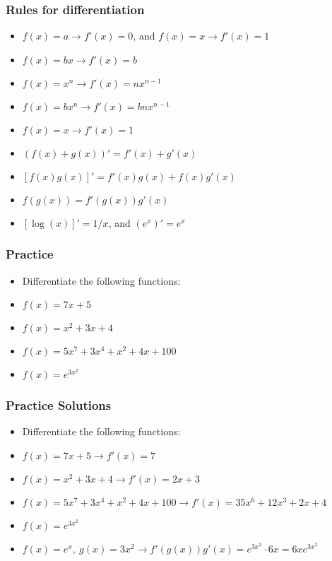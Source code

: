 \documentclass[xcolor=dvipsnames]{beamer} %
\begin{document}
\begin{frame}
\frametitle{Rules for differentiation}
\begin{itemize}
    \setlength\itemsep{1em}
\item $f(x) = a \rightarrow f'(x) = 0$, and $f(x) = x \rightarrow f'(x) = 1$
\item $f(x) = bx \rightarrow f'(x) = b$
\item $f(x) = x^n \rightarrow f'(x) = nx^{n-1}$ %
\item $f(x) = bx^n \rightarrow f'(x) = b n x^{n-1}$
\item $f(x) = x \rightarrow f'(x) = 1$
\item $(f(x) +g(x))' = f'(x) + g'(x)$ 
\item $[f(x)g(x)]' = f'(x)g(x) +f(x)g'(x)$
\item $f(g(x)) =f'(g(x))g'(x)$
\item $[\log(x)]' = 1/x$, and $(e^x)' = e^x$
\end{itemize}
\end{frame}

\begin{frame}
\frametitle{Practice}
\begin{itemize}
    \setlength\itemsep{1em}
\item[] Differentiate the following functions: 
\item $f(x) = 7x + 5$
\item $f(x) = x^2 + 3x + 4$
\item $f(x) = 5x^7 + 3x^4 + x^2 + 4x + 100$
\item $f(x) = e^{3x^2}$
\end{itemize}
\end{frame}

\begin{frame}
\frametitle{Practice Solutions}
\begin{itemize}
    \setlength\itemsep{1em}
\item[] Differentiate the following functions: 
\item $f(x) = 7x + 5 \rightarrow f'(x) = 7$
\item $f(x) = x^2 + 3x + 4 \rightarrow f'(x) = 2x + 3$
\item $f(x) = 5x^7 + 3x^4 + x^2 + 4x + 100 \rightarrow f'(x) = 35x^6 + 12x^3 + 2x + 4$
\item $f(x) = e^{3x^2}$
\item[] $f(x) = e^x,~ g(x) = 3x^2 \rightarrow f'(g(x))g'(x) = e^{3x^2} \cdot 6x = 6xe^{3x^2}$
\end{itemize}
\end{frame}
\end{document}
